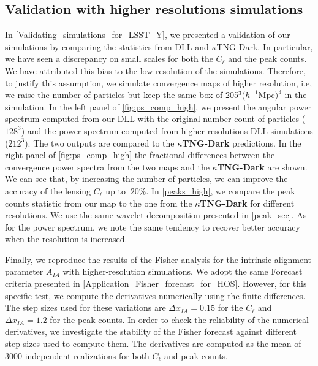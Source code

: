 \documentclass{aa}
\begin{document}
\begin{appendix}
\section{Validation with higher resolutions simulations}
In \autoref{Validating_simulations_for_LSST_Y}, we presented a validation of our simulations by comparing the statistics from DLL and $\kappa$TNG-Dark.
In particular, we have seen a discrepancy on small scales for both the $C_{\ell}$ and the peak counts. We have attributed this bias to the low resolution of the simulations. Therefore, to justify this assumption, we simulate convergence maps of higher resolution, i.e, we raise the number of particles but keep the same box of 205$^3$($h^{-1}$Mpc$)^3$ in the simulation. In the left panel of  \autoref{fig:ps_comp_high}, we present the angular power spectrum computed from our DLL with the original number count of particles ($128^3$) and the power spectrum computed from higher resolutions DLL simulations ($212^3$). The two outputs are compared to the \textbf{$\kappa$TNG-Dark} predictions. In the right panel  of \autoref{fig:ps_comp_high} the fractional differences between the convergence power spectra from the two maps and the \textbf{$\kappa$TNG-Dark} are shown. We can see that, by increasing the number of particles, we can improve the accuracy of the lensing $C_{\ell}$ up to $~20\%$.
In \autoref{peaks_high}, we compare the peak counts statistic from our map to the one from the \textbf{$\kappa$TNG-Dark} for different resolutions. We use the same wavelet decomposition presented in \autoref{peak_sec}. As for the power spectrum, we note the same tendency to recover better accuracy when the resolution is increased. 

Finally, we reproduce the results of the Fisher analysis for the intrinsic alignment parameter $A_{IA}$ with higher-resolution simulations. We adopt the same Forecast criteria presented in \autoref{Application_Fisher_forecast_for_HOS}. However, for this specific test, we compute the derivatives numerically using the finite differences. The step sizes used for these variations are $\Delta x_{IA}=0.15$ for the $C_{\ell}$ and $\Delta x_{IA}=1.2$ for the peak counts. 
In order to check the reliability of the numerical derivatives, we investigate the stability of the Fisher forecast against different step sizes used to compute them.
The derivatives are computed as the mean of 3000 independent realizations for both $C_{\ell}$ and peak counts. 


\end{appendix}
\end{document}
